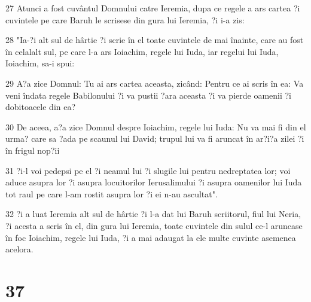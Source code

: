 \par 27 Atunci a fost cuvântul Domnului catre Ieremia, dupa ce regele a ars cartea ?i cuvintele pe care Baruh le scrisese din gura lui Ieremia, ?i i-a zis:
\par 28 "Ia-?i alt sul de hârtie ?i scrie în el toate cuvintele de mai înainte, care au fost în celalalt sul, pe care l-a ars Ioiachim, regele lui Iuda, iar regelui lui Iuda, Ioiachim, sa-i spui:
\par 29 A?a zice Domnul: Tu ai ars cartea aceasta, zicând: Pentru ce ai scris în ea: Va veni îndata regele Babilonului ?i va pustii ?ara aceasta ?i va pierde oamenii ?i dobitoacele din ea?
\par 30 De aceea, a?a zice Domnul despre Ioiachim, regele lui Iuda: Nu va mai fi din el urma? care sa ?ada pe scaunul lui David; trupul lui va fi aruncat în ar?i?a zilei ?i în frigul nop?ii
\par 31 ?i-l voi pedepsi pe el ?i neamul lui ?i slugile lui pentru nedreptatea lor; voi aduce asupra lor ?i asupra locuitorilor Ierusalimului ?i asupra oamenilor lui Iuda tot raul pe care l-am rostit asupra lor ?i ei n-au ascultat".
\par 32 ?i a luat Ieremia alt sul de hârtie ?i l-a dat lui Baruh scriitorul, fiul lui Neria, ?i acesta a scris în el, din gura lui Ieremia, toate cuvintele din sulul ce-l aruncase în foc Ioiachim, regele lui Iuda, ?i a mai adaugat la ele multe cuvinte asemenea acelora.

\chapter{37}


